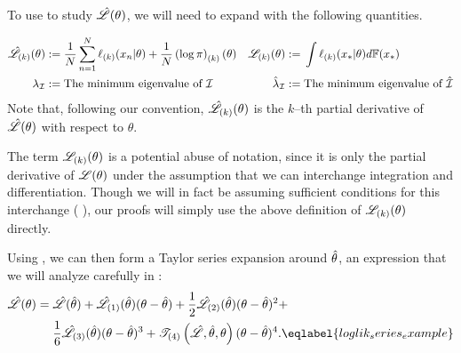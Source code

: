 To use  to study $\hat{\mathscr{L}}(\theta)$, we will need to
expand  with the following quantities.

\begin{defn}
\begin{align*}
%
\likhatk{k}(\theta) :={}&
   \frac{1}{N} \sumn \ellgrad{k}(\x_n \vert \theta) +
    \frac{1}{N} \logpriorgrad{k}(\theta)
&
\likk{k}(\theta) :={}& \int \ellgrad{k}(\xn \vert \theta) d\fdist(\xn)
\\
\infoev :={}& \textrm{The minimum eigenvalue of }\info &
\infoevhat :={}& \textrm{The minimum eigenvalue of }\infohat
%
\end{align*}
%
Note that, following our convention, $\hat{\mathscr{L}}_{(k)}(\theta)$ is the $k$--th
partial derivative of $\hat{\mathscr{L}}(\theta)$ with respect to $\theta$.

The term $\mathscr{L}_{(k)}(\theta)$ is a potential abuse of notation, since it is only
the partial derivative of $\mathscr{L}(\theta)$ under the assumption that we can
interchange integration and differentiation.  Though we will in fact be assuming
sufficient conditions for this interchange (
), our proofs will simply use the above definition of
$\mathscr{L}_{(k)}(\theta)$ directly.
\end{defn}
%
Using , we can then form a Taylor series expansion
around $\hat\theta$, an expression that we will analyze carefully in
:
%
\begin{align}
\likhat(\theta) ={}&
    \likhat(\thetahat) +
    \likhatk{1}(\thetahat)(\theta - \thetahat) +
    \frac{1}{2}\likhatk{2}(\thetahat)(\theta - \thetahat)^2 +
\nonumber
\\&
    \frac{1}{6}\likhatk{3}(\thetahat)(\theta - \thetahat)^3 +
    \tresid{4}{\likhat, \thetahat, \theta} (\theta - \thetahat)^4.
    \eqlabel{loglik_series_example}
\end{align}
%

